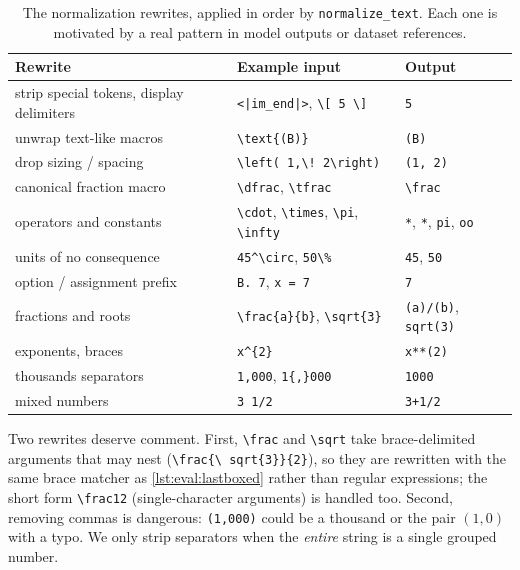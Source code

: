 \begin{table}[t]
\centering\small
\begin{tabular}{@{}lll@{}}
\toprule
Rewrite & Example input & Output \\
\midrule
strip special tokens, display delimiters & \texttt{<|im\_end|>}, \texttt{\textbackslash[ 5 \textbackslash]} & \texttt{5} \\
unwrap text-like macros & \texttt{\textbackslash text\{(B)\}} & \texttt{(B)} \\
drop sizing / spacing & \texttt{\textbackslash left( 1,\textbackslash ! 2\textbackslash right)} & \texttt{(1, 2)} \\
canonical fraction macro & \texttt{\textbackslash dfrac}, \texttt{\textbackslash tfrac} & \texttt{\textbackslash frac} \\
operators and constants & \texttt{\textbackslash cdot}, \texttt{\textbackslash times}, \texttt{\textbackslash pi}, \texttt{\textbackslash infty} & \texttt{*}, \texttt{*}, \texttt{pi}, \texttt{oo} \\
units of no consequence & \texttt{45\^{}\textbackslash circ}, \texttt{50\textbackslash\%} & \texttt{45}, \texttt{50} \\
option / assignment prefix & \texttt{B. 7}, \texttt{x = 7} & \texttt{7} \\
fractions and roots & \texttt{\textbackslash frac\{a\}\{b\}}, \texttt{\textbackslash sqrt\{3\}} & \texttt{(a)/(b)}, \texttt{sqrt(3)} \\
exponents, braces & \texttt{x\^{}\{2\}} & \texttt{x**(2)} \\
thousands separators & \texttt{1,000}, \texttt{1\{,\}000} & \texttt{1000} \\
mixed numbers & \texttt{3 1/2} & \texttt{3+1/2} \\
\bottomrule
\end{tabular}
\caption{The normalization rewrites, applied in order by \texttt{normalize\_text}. Each one is
motivated by a real pattern in model outputs or dataset references.}
\label{tab:eval:normalize}
\end{table}

Two rewrites deserve comment. First, \texttt{\textbackslash frac} and \texttt{\textbackslash sqrt}
take brace-delimited arguments that may nest (\texttt{\textbackslash frac\{\textbackslash
sqrt\{3\}\}\{2\}}), so they are rewritten with the same brace matcher as \cref{lst:eval:lastboxed}
rather than regular expressions; the short form \texttt{\textbackslash frac12} (single-character
arguments) is handled too. Second, removing commas is dangerous: \texttt{(1,000)} could be a
thousand or the pair $(1, 0)$ with a typo. We only strip separators when the \emph{entire} string
is a single grouped number.


